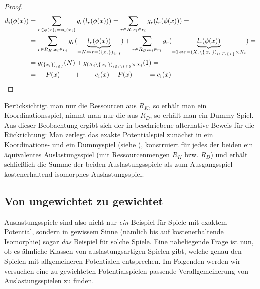 \begin{proof}
	\begin{align*}
		d_{\hat{\imath}}(\phi(x)) 	&=\sum_{r \in \phi(x)_{\hat{\imath}} = \phi_{\hat{\imath}}(x_{\hat{\imath}})} g_r(l_r(\phi(x))) = \sum_{r \in R: x_{\hat{\imath}} \in r_{\hat{\imath}}} g_r(l_r(\phi(x))) = \\
		&=\sum_{r \in R_K: x_{\hat{\imath}} \in r_{\hat{\imath}}} g_r(\underbrace{l_r(\phi(x))}_{= N \Leftrightarrow r = \left(\{x_i\}\right)_{i \in I}}) + \sum_{r \in R_D: x_{\hat{\imath}} \in r_i} g_r(\underbrace{l_r(\phi(x))}_{=1 \Leftrightarrow r = \left(X_i\setminus\set{x_i}\right)_{i \in I\setminus\set{\hat{\imath}}} \times X_{\hat{\imath}}}) = \\
		&=g_{\left(\{x_i\}\right)_{i \in I}}(N) + g_{\left(X_i\setminus\set{x_i}\right)_{i \in I\setminus\set{\hat{\imath}}} \times X_{\hat{\imath}}}(1) = \\
		&=\quad\, P(x) \quad\quad + \quad\quad c_{\hat{\imath}}(x) - P(x) \quad\quad\,\, = c_{\hat{\imath}}(x) \qedhere									
		\end{align*}
\end{proof}

\begin{bem}
	Berücksichtigt man nur die Ressourcen aus $R_K$, so erhält man ein Koordinationsspiel, nimmt man nur die aus $R_D$, so erhält man ein Dummy-Spiel. Aus dieser Beobachtung ergibt sich der in \cite{KoordDummy} beschriebene alternative Beweis für die Rückrichtung: Man zerlegt das exakte Potentialspiel zunächst in ein Koordinations- und ein Dummyspiel (siehe ), konstruiert für jedes der beiden ein äquivalentes Auslastungsspiel (mit Ressourcenmengen $R_K$ bzw. $R_D$) und erhält schließlich die Summe der beiden Auslastungsspiele als zum Ausgangsspiel kostenerhaltend isomorphes Auslastungsspiel.
\end{bem}


\subsection{Von ungewichtet zu gewichtet}

Auslastungsspiele sind also nicht nur \emph{ein} Beispiel für Spiele mit exaktem Potential, sondern in gewissem Sinne (nämlich bis auf kostenerhaltende Isomorphie) sogar \emph{das} Beispiel für solche Spiele. Eine naheliegende Frage ist nun, ob es ähnliche Klassen von \glqq auslastungsartigen\grqq{} Spielen gibt, welche genau den Spielen mit allgemeineren Potentialen entsprechen. Im Folgenden werden wir versuchen eine zu gewichteten Potentialspielen passende Verallgemeinerung von Auslastungsspielen zu finden.

